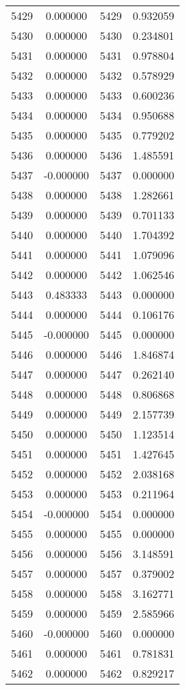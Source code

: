 \documentclass[12pt]{article}
\begin{document}
\begin{longtable}{@{}cccc@{}}
5429 & 0.000000 & 5429 & 0.932059 \\
5430 & 0.000000 & 5430 & 0.234801 \\
5431 & 0.000000 & 5431 & 0.978804 \\
5432 & 0.000000 & 5432 & 0.578929 \\
5433 & 0.000000 & 5433 & 0.600236 \\
5434 & 0.000000 & 5434 & 0.950688 \\
5435 & 0.000000 & 5435 & 0.779202 \\
5436 & 0.000000 & 5436 & 1.485591 \\
5437 & -0.000000 & 5437 & 0.000000 \\
5438 & 0.000000 & 5438 & 1.282661 \\
5439 & 0.000000 & 5439 & 0.701133 \\
5440 & 0.000000 & 5440 & 1.704392 \\
5441 & 0.000000 & 5441 & 1.079096 \\
5442 & 0.000000 & 5442 & 1.062546 \\
5443 & 0.483333 & 5443 & 0.000000 \\
5444 & 0.000000 & 5444 & 0.106176 \\
5445 & -0.000000 & 5445 & 0.000000 \\
5446 & 0.000000 & 5446 & 1.846874 \\
5447 & 0.000000 & 5447 & 0.262140 \\
5448 & 0.000000 & 5448 & 0.806868 \\
5449 & 0.000000 & 5449 & 2.157739 \\
5450 & 0.000000 & 5450 & 1.123514 \\
5451 & 0.000000 & 5451 & 1.427645 \\
5452 & 0.000000 & 5452 & 2.038168 \\
5453 & 0.000000 & 5453 & 0.211964 \\
5454 & -0.000000 & 5454 & 0.000000 \\
5455 & 0.000000 & 5455 & 0.000000 \\
5456 & 0.000000 & 5456 & 3.148591 \\
5457 & 0.000000 & 5457 & 0.379002 \\
5458 & 0.000000 & 5458 & 3.162771 \\
5459 & 0.000000 & 5459 & 2.585966 \\
5460 & -0.000000 & 5460 & 0.000000 \\
5461 & 0.000000 & 5461 & 0.781831 \\
5462 & 0.000000 & 5462 & 0.829217 \\

\end{longtable}
\end{document}
